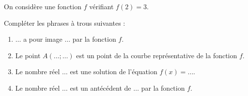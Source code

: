 \begin{exo}{}
	On considère une fonction $f$ vérifiant $f(2) = 3$.

	Compléter les phrases à trous suivantes :
	\begin{enumerate}
		\item $\ldots$ a pour image $\ldots$ par la fonction $f$.
		\item Le point $A(\ldots ; \ldots)$ est un point de la courbe représentative de la fonction $f$.
		\item Le nombre réel $\ldots$ est une solution de l'équation $f(x) = \ldots$.
		\item Le nombre réel $\ldots$ est un antécédent de $\ldots$ par la fonction $f$.
	\end{enumerate}
\end{exo}
